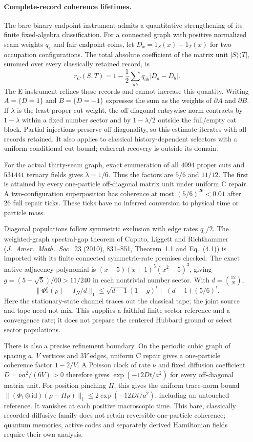 \paragraph{Complete-record coherence lifetimes.}
The bare binary endpoint instrument admits a quantitative strengthening of
its finite fixed-algebra classification. For a connected graph with positive
normalized seam weights $q_e$ and fair endpoint coins, let
$D_x=1_S(x)-1_T(x)$ for two occupation configurations. The total absolute
coefficient of the matrix unit $|S\rangle\langle T|$, summed over every
classically retained record, is
\[
 r_C(S,T)=1-\frac12\sum_{ab}q_{ab}|D_a-D_b|.
\]
The E instrument refines these records and cannot increase this quantity.
Writing $A=\{D=1\}$ and $B=\{D=-1\}$ expresses the sum as the weights of
$\partial A$ and $\partial B$. If $\lambda$ is the least proper cut weight,
the off-diagonal entrywise norm contracts by $1-\lambda$ within a fixed
number sector and by $1-\lambda/2$ outside the full/empty cat block. Partial
injections preserve off-diagonality, so this estimate iterates with all
records retained. It also applies to classical history-dependent selectors
with a uniform conditional cut bound; coherent recovery is outside its domain.

For the actual thirty-seam graph, exact enumeration of all $4094$ proper
cuts and $531441$ ternary fields gives $\lambda=1/6$. Thus the factors are
$5/6$ and $11/12$. The first is attained by every one-particle off-diagonal
matrix unit under uniform C repair. A two-configuration superposition has
coherence at most $(5/6)^{26}<0.01$ after $26$ full repair ticks. These ticks
have no inferred conversion to physical time or particle mass.

Diagonal populations follow symmetric exclusion with edge rates $q_e/2$.
The weighted-graph spectral-gap theorem of Caputo, Liggett and Richthammer
(\emph{J.~Amer.~Math.~Soc.}~23 (2010), 831--851, Theorem~1.1 and
Eq.~(4.1)) is imported with its finite connected symmetric-rate premises
checked. The exact native adjacency polynomial is
$(x-5)(x+1)^5(x^2-5)^3$, giving
$g=(5-\sqrt5)/60>11/240$ in each nontrivial number sector. With
$d=\binom{12}{N}$,
\[
 \|\Phi_*^t(\rho)-I_N/d\|_1
 \leq\sqrt{d-1}(1-g)^t+(d-1)(5/6)^t.
\]
Here the stationary-state channel traces out the classical tape; the joint
source and tape need not mix. This supplies a faithful finite-sector reference and a convergence rate;
it does not prepare the centered Hubbard ground or select sector populations.

There is also a precise refinement boundary. On the periodic cubic graph
of spacing $a$, $V$ vertices and $3V$ edges, uniform C repair gives a
one-particle coherence factor $1-2/V$. A Poisson clock of rate $\nu$ and
fixed diffusion coefficient $D=\nu a^2/(6V)>0$ therefore gives
$\exp(-12Dt/a^2)$ for every off-diagonal matrix unit. For position pinching
$\Pi$, this gives the uniform trace-norm bound
$\|(\Phi_t\otimes\mathrm{id})(\rho-\Pi\rho)\|_1\leq2\exp(-12Dt/a^2)$,
including an untouched reference. It vanishes at each positive macroscopic time.
This bare, classically recorded diffusive family
does not retain reversible one-particle coherence; quantum memories, active
codes and separately derived Hamiltonian fields require their own analysis.
